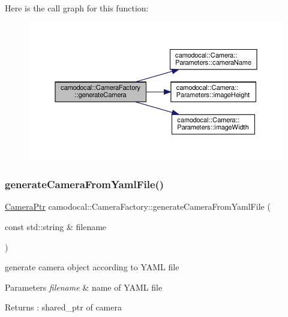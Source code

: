 Here is the call graph for this function\+:\nopagebreak
\begin{figure}[H]
\begin{center}
\leavevmode
\includegraphics[width=350pt]{classcamodocal_1_1CameraFactory_a853fe9e847faae5caa3981f87a9ab7c8_cgraph}
\end{center}
\end{figure}
\mbox{\label{classcamodocal_1_1CameraFactory_a8362492960d68a4ae43c40a1952df3a5}} 
\subsubsection{\texorpdfstring{generate\+Camera\+From\+Yaml\+File()}{generateCameraFromYamlFile()}}
{\footnotesize\ttfamily \hyperlink{Camera_8h_a9f66c7d396fa23ffb2a4512670a78b84}{Camera\+Ptr} camodocal\+::\+Camera\+Factory\+::generate\+Camera\+From\+Yaml\+File (\begin{DoxyParamCaption}\item[{const std\+::string \&}]{filename }\end{DoxyParamCaption})}



generate camera object according to Y\+A\+ML file 


\begin{DoxyParams}{Parameters}
{\em filename} & name of Y\+A\+ML file \\
\hline
\end{DoxyParams}
\begin{DoxyReturn}{Returns}
\+: shared\+\_\+ptr of camera 
\end{DoxyReturn}


